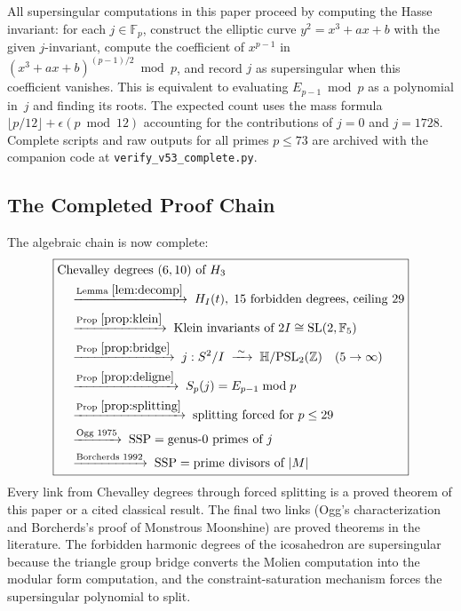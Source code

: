 \documentclass[11pt,letterpaper]{article}
\theoremstyle{definition}
\newcommand{\HH}{\mathbb{H}}
\newcommand{\ZZ}{\mathbb{Z}}
\newcommand{\FF}{\mathbb{F}}
\newcommand{\abs}[1]{\lvert #1 \rvert}
\begin{document}
\begin{remarkbox}
All supersingular computations in this paper proceed by computing the Hasse invariant: for each $j\in\FF_p$, construct the elliptic curve $y^2=x^3+ax+b$ with the given $j$-invariant, compute the coefficient of $x^{p-1}$ in $(x^3+ax+b)^{(p-1)/2}\bmod p$, and record $j$ as supersingular when this coefficient vanishes.  This is equivalent to evaluating $E_{p-1}\bmod p$ as a polynomial in~$j$ and finding its roots.  The expected count uses the mass formula $\lfloor p/12\rfloor+\epsilon(p\bmod 12)$ accounting for the contributions of $j=0$ and $j=1728$.  Complete scripts and raw outputs for all primes $p\le 73$ are archived with the companion code at \textup{\texttt{verify\_v53\_complete.py}}.
\end{remarkbox}
\subsection{The Completed Proof Chain}\label{sec:fullchain}
The algebraic chain is now complete:
\begin{equation}\label{eq:fullchain}
\boxed{
\begin{aligned}
  &\text{Chevalley degrees }(6,10)\text{ of }H_3\\
  &\quad\xrightarrow{\text{Lemma }\ref{lem:decomp}}\; H_I(t),\;\text{15 forbidden degrees, ceiling }29\\
  &\quad\xrightarrow{\text{Prop }\ref{prop:klein}}\; \text{Klein invariants of }2I\cong\mathrm{SL}(2,\FF_5)\\
  &\quad\xrightarrow{\text{Prop }\ref{prop:bridge}}\; j:S^2/I\;\xrightarrow{\;\sim\;}\;\HH/\mathrm{PSL}_2(\ZZ)\quad(5\to\infty)\\
  &\quad\xrightarrow{\text{Prop }\ref{prop:deligne}}\; S_p(j)=E_{p-1}\bmod p\\
  &\quad\xrightarrow{\text{Prop }\ref{prop:splitting}}\; \text{splitting forced for }p\le 29\\
  &\quad\xrightarrow{\text{Ogg 1975}}\; \text{SSP}=\text{genus-0 primes of }j\\
  &\quad\xrightarrow{\text{Borcherds 1992}}\; \text{SSP}=\text{prime divisors of }\abs{M}
\end{aligned}}
\end{equation}
Every link from Chevalley degrees through forced splitting is a proved theorem of this paper or a cited classical result.  The final two links (Ogg's characterization and Borcherds's proof of Monstrous Moonshine) are proved theorems in the literature.  The forbidden harmonic degrees of the icosahedron are supersingular because the triangle group bridge converts the Molien computation into the modular form computation, and the constraint-saturation mechanism forces the supersingular polynomial to split.
\end{document}
